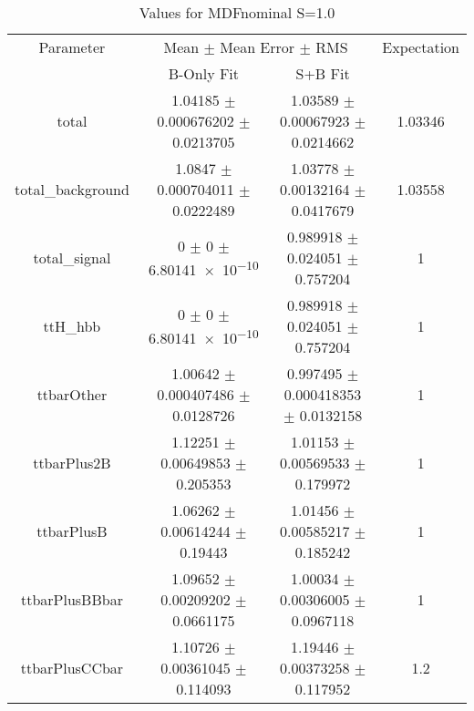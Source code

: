 \begin{table}
\centering
\caption{Values for MDFnominal S=1.0}
\begin{tabular}{cccc}
\toprule
Parameter & \multicolumn{2}{c}{Mean $\pm$ Mean Error $\pm$ RMS} & Expectation\\
 & B-Only Fit & S+B Fit & \\
\midrule
total & \num{1.04185} $\pm$ \num{0.000676202} $\pm$ \num{0.0213705} & \num{1.03589} $\pm$ \num{0.00067923} $\pm$ \num{0.0214662} & \num{1.03346}\\
total\_background & \num{1.0847} $\pm$ \num{0.000704011} $\pm$ \num{0.0222489} & \num{1.03778} $\pm$ \num{0.00132164} $\pm$ \num{0.0417679} & \num{1.03558}\\
total\_signal & \num{0} $\pm$ \num{0} $\pm$ \num{6.80141e-10} & \num{0.989918} $\pm$ \num{0.024051} $\pm$ \num{0.757204} & \num{1}\\
ttH\_hbb & \num{0} $\pm$ \num{0} $\pm$ \num{6.80141e-10} & \num{0.989918} $\pm$ \num{0.024051} $\pm$ \num{0.757204} & \num{1}\\
ttbarOther & \num{1.00642} $\pm$ \num{0.000407486} $\pm$ \num{0.0128726} & \num{0.997495} $\pm$ \num{0.000418353} $\pm$ \num{0.0132158} & \num{1}\\
ttbarPlus2B & \num{1.12251} $\pm$ \num{0.00649853} $\pm$ \num{0.205353} & \num{1.01153} $\pm$ \num{0.00569533} $\pm$ \num{0.179972} & \num{1}\\
ttbarPlusB & \num{1.06262} $\pm$ \num{0.00614244} $\pm$ \num{0.19443} & \num{1.01456} $\pm$ \num{0.00585217} $\pm$ \num{0.185242} & \num{1}\\
ttbarPlusBBbar & \num{1.09652} $\pm$ \num{0.00209202} $\pm$ \num{0.0661175} & \num{1.00034} $\pm$ \num{0.00306005} $\pm$ \num{0.0967118} & \num{1}\\
ttbarPlusCCbar & \num{1.10726} $\pm$ \num{0.00361045} $\pm$ \num{0.114093} & \num{1.19446} $\pm$ \num{0.00373258} $\pm$ \num{0.117952} & \num{1.2}\\
\bottomrule
\end{tabular}
\end{table}